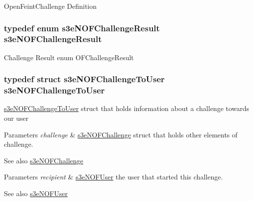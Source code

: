 \label{group___n_open_feint_api_group_gabc8d488f663fbf90990f7436e14f2161}
OpenFeintChallenge Definition \hypertarget{group___n_open_feint_api_group_ga72aba52b0a4382e49b79f18ea4dfebbd}{
\subsubsection[{s3eNOFChallengeResult}]{\setlength{\rightskip}{0pt plus 5cm}typedef enum {\bf s3eNOFChallengeResult}  {\bf s3eNOFChallengeResult}}}
\label{group___n_open_feint_api_group_ga72aba52b0a4382e49b79f18ea4dfebbd}
Challenge Result enum OFChallengeResult \hypertarget{group___n_open_feint_api_group_ga7b4c00e0398b253d54165af119d4ad99}{
\subsubsection[{s3eNOFChallengeToUser}]{\setlength{\rightskip}{0pt plus 5cm}typedef struct {\bf s3eNOFChallengeToUser}  {\bf s3eNOFChallengeToUser}}}
\label{group___n_open_feint_api_group_ga7b4c00e0398b253d54165af119d4ad99}
\hyperlink{structs3e_n_o_f_challenge_to_user}{s3eNOFChallengeToUser} struct that holds information about a challenge towards our user


\begin{DoxyParams}{Parameters}
{\em challenge} & \hyperlink{structs3e_n_o_f_challenge}{s3eNOFChallenge} struct that holds other elements of challenge. \\
\hline
\end{DoxyParams}
\begin{DoxySeeAlso}{See also}
\hyperlink{structs3e_n_o_f_challenge}{s3eNOFChallenge} 
\end{DoxySeeAlso}

\begin{DoxyParams}{Parameters}
{\em recipient} & \hyperlink{structs3e_n_o_f_user}{s3eNOFUser} the user that started this challenge. \\
\hline
\end{DoxyParams}
\begin{DoxySeeAlso}{See also}
\hyperlink{structs3e_n_o_f_user}{s3eNOFUser} 
\end{DoxySeeAlso}

